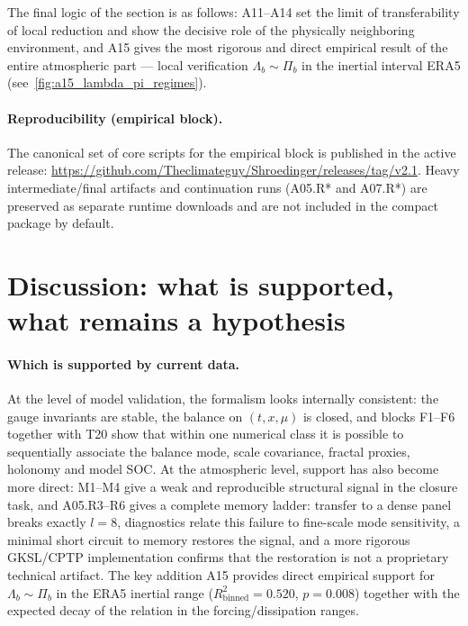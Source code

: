 \documentclass[11pt,a4paper]{article}
\theoremstyle{definition}
\theoremstyle{plain}
\theoremstyle{remark}
\begin{document}
The final logic of the section is as follows: A11--A14 set the limit of transferability of local reduction and show the decisive role of the physically neighboring environment, and A15 gives the most rigorous and direct empirical result of the entire atmospheric part --- local verification \(\Lambda_b\sim\Pi_b\) in the inertial interval ERA5 (see\ \cref{fig:a15_lambda_pi_regimes}).

\paragraph{Reproducibility (empirical block).}
The canonical set of core scripts for the empirical block is published in the active release:
\url{https://github.com/Theclimateguy/Shroedinger/releases/tag/v2.1}.
Heavy intermediate/final artifacts and continuation runs (A05.R* and A07.R*) are preserved as separate runtime downloads and are not included in the compact package by default.

\section{Discussion: what is supported, what remains a hypothesis}
\label{sec:discussion}

\paragraph{Which is supported by current data.}
At the level of model validation, the formalism looks internally consistent:
the gauge invariants are stable, the balance on $(t,x,\mu)$ is closed,
and blocks F1--F6 together with T20 show that within one numerical class it is possible to sequentially associate the balance mode,
scale covariance, fractal proxies, holonomy and model SOC.
At the atmospheric level, support has also become more direct:
M1--M4 give a weak and reproducible structural signal in the closure task,
and A05.R3--R6 gives a complete memory ladder: transfer to a dense panel breaks exactly $l=8$,
diagnostics relate this failure to fine-scale mode sensitivity, a minimal short circuit to memory restores the signal,
and a more rigorous GKSL/CPTP implementation confirms that the restoration is not a proprietary technical artifact.
The key addition A15 provides direct empirical support for \(\Lambda_b\sim\Pi_b\) in the ERA5 inertial range
(\(R^2_{\mathrm{binned}}=0.520\), \(p=0.008\)) together with the expected decay of the relation in the forcing/dissipation ranges.
\end{document}
